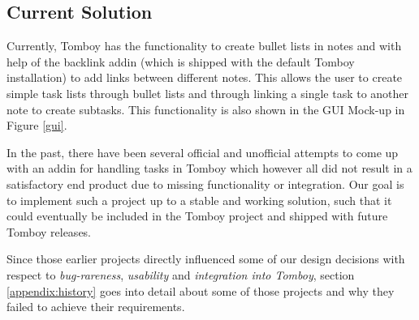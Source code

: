 \subsection{Current Solution}
\label{description:solution}
Currently, Tomboy has the functionality to create bullet lists in notes and with help of the backlink addin (which is shipped with the default Tomboy installation) to add links between different notes. This allows the user to create simple task lists through bullet lists and through linking a single task to another note to create subtasks. This functionality is also shown in the GUI Mock-up in Figure \ref{gui}.

In the past, there have been several official and unofficial attempts to come up with an addin for handling tasks in Tomboy which however all did not result in a satisfactory end product due to missing functionality or integration. Our goal is to implement such a project up to a stable and working solution, such that it could eventually be included in the Tomboy project and shipped with future Tomboy releases. 

Since those earlier projects directly influenced some of our design decisions with respect to \textit{bug-rareness}, \textit{usability} and \textit{integration into Tomboy}, section \ref{appendix:history} goes into detail about some of those projects and why they failed to achieve their requirements.

